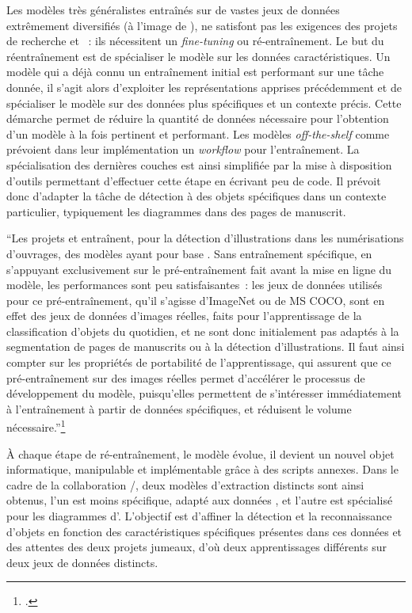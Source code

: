 Les modèles très généralistes entraînés sur de vastes jeux de données
extrêmement diversifiés (à l'image de \yolov), ne satisfont pas les
exigences des projets de recherche \eida et \vhs~: ils nécessitent un
\emph{fine-tuning} ou ré-entraînement. Le but du réentraînement est de
spécialiser le modèle sur les données caractéristiques. Un modèle qui a
déjà connu un entraînement initial est performant sur une tâche donnée,
il s'agit alors d'exploiter les représentations apprises précédemment et
de spécialiser le modèle sur des données plus spécifiques et un contexte
précis. Cette démarche permet de réduire la quantité de données
nécessaire pour l'obtention d'un modèle à la fois pertinent et
performant. Les modèles \textit{off-the-shelf} comme \yolov prévoient dans leur
implémentation un \textit{workflow} pour l'entraînement. La spécialisation des
dernières couches est ainsi simplifiée par la mise à disposition
d'outils permettant d'effectuer cette étape en écrivant peu de code. Il
prévoit donc d'adapter la tâche de détection à des objets spécifiques
dans un contexte particulier, typiquement les diagrammes dans des pages
de manuscrit.

\begin{kwote}                                       
``Les projets \eida et \vhs entraînent, pour la détection d'illustrations
dans les numérisations d'ouvrages, des modèles ayant pour base \yolov.
Sans entraînement spécifique, en s'appuyant exclusivement sur le
pré-entraînement fait avant la mise en ligne du modèle, les performances
sont peu satisfaisantes~: les jeux de données utilisés pour ce
pré-entraînement, qu'il s'agisse d'ImageNet ou de MS COCO, sont en effet
des jeux de données d'images réelles, faits pour l'apprentissage de la
classification d'objets du quotidien, et ne sont donc initialement pas
adaptés à la segmentation de pages de manuscrits ou à la détection
d'illustrations. Il faut ainsi compter sur les propriétés de portabilité
de l'apprentissage, qui assurent que ce pré-entraînement sur des images
réelles permet d'accélérer le processus de développement du modèle,
puisqu'elles permettent de s'intéresser immédiatement à l'entraînement à
partir de données spécifiques, et réduisent le volume
nécessaire.''\footcite[p.44]{norindr_traitement_2023}
                      \end{kwote}       

À chaque étape de ré-entraînement, le modèle évolue, il devient un
nouvel objet informatique, manipulable et implémentable grâce à des
scripts annexes. Dans le cadre de la collaboration \eida/\vhs, deux
modèles d'extraction distincts sont ainsi obtenus, l'un est moins
spécifique, adapté aux données \vhs, et l'autre est spécialisé pour les
diagrammes d'\eida. L'objectif est d'affiner la détection et la
reconnaissance d'objets en fonction des caractéristiques spécifiques
présentes dans ces données et des attentes des deux projets jumeaux,
d'où deux apprentissages différents sur deux jeux de données distincts.

